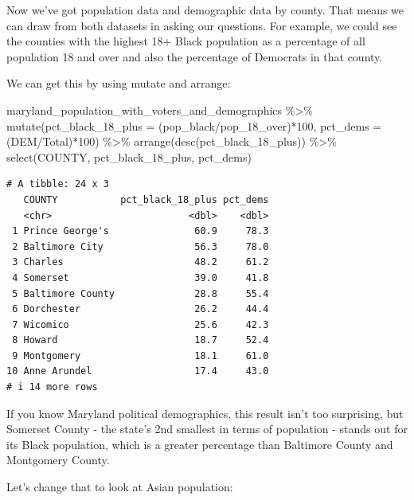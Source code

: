 \documentclass[
  letterpaper,
  DIV=11,
  numbers=noendperiod]{scrreprt}
\newenvironment{Shaded}{\begin{snugshade}}{\end{snugshade}}
\newcommand{\AttributeTok}[1]{\textcolor[rgb]{0.40,0.45,0.13}{#1}}
\newcommand{\DecValTok}[1]{\textcolor[rgb]{0.68,0.00,0.00}{#1}}
\newcommand{\FunctionTok}[1]{\textcolor[rgb]{0.28,0.35,0.67}{#1}}
\newcommand{\NormalTok}[1]{\textcolor[rgb]{0.00,0.23,0.31}{#1}}
\newcommand{\SpecialCharTok}[1]{\textcolor[rgb]{0.37,0.37,0.37}{#1}}
\begin{document}
Now we've got population data and demographic data by county. That means
we can draw from both datasets in asking our questions. For example, we
could see the counties with the highest 18+ Black population as a
percentage of all population 18 and over and also the percentage of
Democrats in that county.

We can get this by using mutate and arrange:

\begin{Shaded}
\begin{Highlighting}[]
\NormalTok{maryland\_population\_with\_voters\_and\_demographics }\SpecialCharTok{\%\textgreater{}\%}
  \FunctionTok{mutate}\NormalTok{(}\AttributeTok{pct\_black\_18\_plus =}\NormalTok{ (pop\_black}\SpecialCharTok{/}\NormalTok{pop\_18\_over)}\SpecialCharTok{*}\DecValTok{100}\NormalTok{, }\AttributeTok{pct\_dems =}\NormalTok{ (DEM}\SpecialCharTok{/}\NormalTok{Total)}\SpecialCharTok{*}\DecValTok{100}\NormalTok{) }\SpecialCharTok{\%\textgreater{}\%}
  \FunctionTok{arrange}\NormalTok{(}\FunctionTok{desc}\NormalTok{(pct\_black\_18\_plus)) }\SpecialCharTok{\%\textgreater{}\%}
  \FunctionTok{select}\NormalTok{(COUNTY, pct\_black\_18\_plus, pct\_dems)}
\end{Highlighting}
\end{Shaded}

\begin{verbatim}
# A tibble: 24 x 3
   COUNTY           pct_black_18_plus pct_dems
   <chr>                        <dbl>    <dbl>
 1 Prince George's               60.9     78.3
 2 Baltimore City                56.3     78.0
 3 Charles                       48.2     61.2
 4 Somerset                      39.0     41.8
 5 Baltimore County              28.8     55.4
 6 Dorchester                    26.2     44.4
 7 Wicomico                      25.6     42.3
 8 Howard                        18.7     52.4
 9 Montgomery                    18.1     61.0
10 Anne Arundel                  17.4     43.0
# i 14 more rows
\end{verbatim}

If you know Maryland political demographics, this result isn't too
surprising, but Somerset County - the state's 2nd smallest in terms of
population - stands out for its Black population, which is a greater
percentage than Baltimore County and Montgomery County.

Let's change that to look at Asian population:
\end{document}
